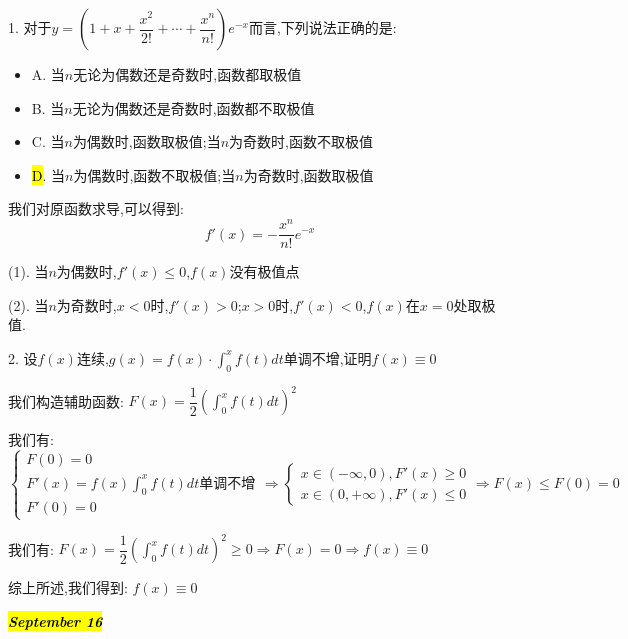 1. 对于$y=\left(1+x+\dfrac{x^2}{2!}+\cdots+\dfrac{x^n}{n!} \right)e^{-x}$而言,下列说法正确的是:  
\begin{itemize}
	\item A. 当$n$无论为偶数还是奇数时,函数都取极值
	\item B. 当$n$无论为偶数还是奇数时,函数都不取极值
	\item C. 当$n$为偶数时,函数取极值;当$n$为奇数时,函数不取极值
	\item \hl{D}. 当$n$为偶数时,函数不取极值;当$n$为奇数时,函数取极值
\end{itemize}
\begin{solution}

	我们对原函数求导,可以得到:  
	$$f'(x)=-\dfrac{x^{n}}{n!}e^{-x}$$
	
	(1). 当$n$为偶数时,$f'(x)\leq 0$,$f(x)$没有极值点
	
	(2). 当$n$为奇数时,$x<0$时,$f'(x)>0$;$x>0$时,$f'(x)<0$,$f(x)$在$x=0$处取极值.
\end{solution}

2. 设$f(x)$连续,$g(x)=f(x)\cdot\int_{0}^{x}f(t)dt$单调不增,证明$f(x)\equiv 0$
\begin{solution}

	我们构造辅助函数:  $F(x)=\dfrac{1}{2}\left(\int_{0}^{x}f(t)dt \right)^2$
	
	我们有:  $$\left\lbrace
	\begin{array}{l}
		F(0)=0\\
		F'(x)=f(x)\int_{0}^{x}f(t)dt\text{单调不增}\\
		F'(0)=0
	\end{array}
	\right. \Rightarrow \left\lbrace
	\begin{array}{l}
		x\in(-\infty,0),F'(x)\geq 0\\
		x\in(0,+\infty),F'(x)\leq 0
	\end{array}
	\right. \Rightarrow F(x)\leq F(0)=0$$
	
	我们有:  $F(x)=\dfrac{1}{2}\left(\int_{0}^{x}f(t)dt \right)^2\geq 0\Rightarrow F(x)=0\Rightarrow f(x)\equiv 0$
	
	综上所述,我们得到:  $f(x)\equiv 0$
\end{solution}

\hl{\textbf{\textit{September 16}}}

